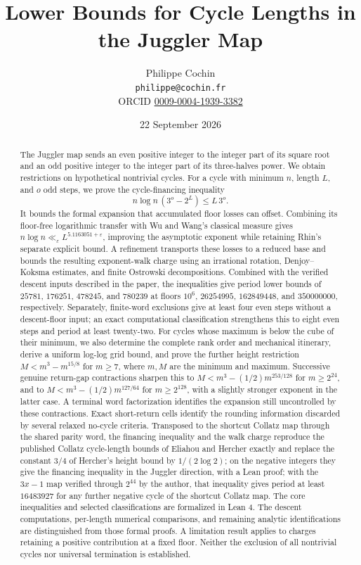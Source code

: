 \documentclass[12pt]{article}
\title{Lower Bounds for Cycle Lengths in the Juggler Map}
\author{Philippe Cochin \\ \texttt{philippe@cochin.fr} \\
  \small ORCID \href{https://orcid.org/0009-0004-1939-3382}{0009-0004-1939-3382}}
\date{22 September 2026}
\begin{document}
\maketitle
\begin{abstract}

The Juggler map sends an even positive integer to the integer part of
its square root and an odd positive integer to the integer part of its
three-halves power. We obtain restrictions on hypothetical nontrivial
cycles. For a cycle with minimum \(n\), length \(L\), and \(o\) odd
steps, we prove the cycle-financing inequality \[
n\log n\,(3^o-2^L)\le L\,3^o.
\] It bounds the formal expansion that accumulated floor losses can
offset. Combining its floor-free logarithmic transfer with Wu and Wang's
classical measure gives
\(n\log n\ll_\varepsilon L^{5.1163051+\varepsilon}\), improving the
asymptotic exponent while retaining Rhin's separate explicit bound. A
refinement transports these losses to a reduced base and bounds the
resulting exponent-walk charge using an irrational rotation,
Denjoy--Koksma estimates, and finite Ostrowski decompositions. Combined
with the verified descent inputs described in the paper, the
inequalities give period lower bounds of \(25781\), \(176251\),
\(478245\), and \(780239\) at floors \(10^6\), \(26254995\),
\(162849448\), and \(350000000\), respectively. Separately, finite-word
exclusions give at least four even steps without a descent-floor input;
an exact computational classification strengthens this to eight even
steps and period at least twenty-two. For cycles whose maximum is below
the cube of their minimum, we also determine the complete rank order and
mechanical itinerary, derive a uniform log-log grid bound, and prove the
further height restriction \(M<m^3-m^{15/8}\) for \(m\ge7\), where
\(m,M\) are the minimum and maximum. Successive genuine return-gap
contractions sharpen this to \(M<m^3-(1/2)m^{253/128}\) for
\(m\ge2^{24}\), and to \(M<m^3-(1/2)m^{127/64}\) for \(m\ge2^{128}\),
with a slightly stronger exponent in the latter case. A terminal word
factorization identifies the expansion still uncontrolled by these
contractions. Exact short-return cells identify the rounding information
discarded by several relaxed no-cycle criteria. Transposed to the
shortcut Collatz map through the shared parity word, the financing
inequality and the walk charge reproduce the published Collatz
cycle-length bounds of Eliahou and Hercher exactly and replace the
constant \(3/4\) of Hercher's height bound by \(1/(2\log 2)\); on the
negative integers they give the financing inequality in the Juggler
direction, with a Lean proof; with the \(3x-1\) map verified through
\(2^{44}\) by the author, that inequality gives period at least
\(16483927\) for any further negative cycle of the shortcut Collatz map.
The core inequalities and selected classifications are formalized in
Lean 4. The descent computations, per-length numerical comparisons, and
remaining analytic identifications are distinguished from those formal
proofs. A limitation result applies to charges retaining a positive
contribution at a fixed floor. Neither the exclusion of all nontrivial
cycles nor universal termination is established.

\end{abstract}
\end{document}
